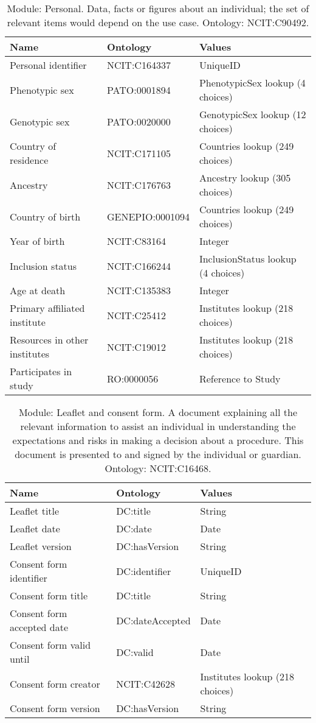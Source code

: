 \documentclass{article}
\begin{document}
\begin{table}[htb]
\begin{tabular}{lll}
Name & Ontology & Values \\
\hline
Personal identifier & NCIT:C164337 & UniqueID \\
Phenotypic sex & PATO:0001894 & PhenotypicSex lookup (4 choices) \\
Genotypic sex & PATO:0020000 & GenotypicSex lookup (12 choices) \\
Country of residence & NCIT:C171105 & Countries lookup (249 choices) \\
Ancestry & NCIT:C176763 & Ancestry lookup (305 choices) \\
Country of birth & GENEPIO:0001094 & Countries lookup (249 choices) \\
Year of birth & NCIT:C83164 & Integer \\
Inclusion status & NCIT:C166244 & InclusionStatus lookup (4 choices) \\
Age at death & NCIT:C135383 & Integer \\
Primary affiliated institute & NCIT:C25412 & Institutes lookup (218 choices) \\
Resources in other institutes & NCIT:C19012 & Institutes lookup (218 choices) \\
Participates in study & RO:0000056 & Reference to Study \\
\hline
\end{tabular}
\caption[Module: Personal]{\label{table:table3} Module: Personal. Data, facts or figures about an individual; the set of relevant items would depend on the use case. Ontology: NCIT:C90492. }
\end{table}

\begin{table}[htb]
\begin{tabular}{lll}
Name & Ontology & Values \\
\hline
Leaflet title & DC:title & String \\
Leaflet date & DC:date & Date \\
Leaflet version & DC:hasVersion & String \\
Consent form identifier & DC:identifier & UniqueID \\
Consent form title & DC:title & String \\
Consent form accepted date & DC:dateAccepted & Date \\
Consent form valid until & DC:valid & Date \\
Consent form creator & NCIT:C42628 & Institutes lookup (218 choices) \\
Consent form version & DC:hasVersion & String \\
\hline
\end{tabular}
\caption[Module: Leaflet and consent form]{\label{table:table4} Module: Leaflet and consent form. A document explaining all the relevant information to assist an individual in understanding the expectations and risks in making a decision about a procedure. This document is presented to and signed by the individual or guardian. Ontology: NCIT:C16468. }
\end{table}
\end{document}

